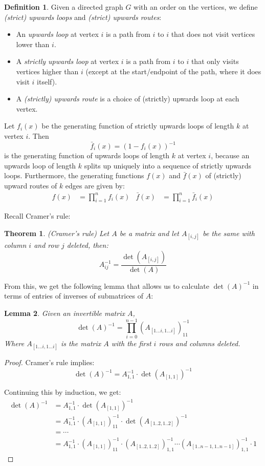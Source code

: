 \documentclass[a4paper, 11pt]{article}
\newtheorem{theorem}{Theorem}[section]
\newtheorem{lemma}[theorem]{Lemma}
\theoremstyle{definition}
\newtheorem{definition}{Definition}[section]
\begin{document}
\begin{definition}
  Given a directed graph $G$ with an order on the vertices, we define \emph{(strict) upwards loops} and \emph{(strict) upwards routes}:
  \begin{itemize}
    \item An \emph{upwards loop} at vertex $i$ is a path from $i$ to $i$ that does not visit vertices lower than $i$.
    \item A \emph{strictly upwards loop} at vertex $i$ is a path from $i$ to $i$ that only visits vertices higher than $i$ (except at the start/endpoint of the path, where it does visit $i$ itself).
    \item A \emph{(strictly) upwards route} is a choice of (strictly) upwards loop at each vertex.
  \end{itemize}
  Let $f_i(x)$ be the generating function of strictly upwards loops of length $k$ at vertex $i$. Then \[ \bar{f}_i(x) = (1 - f_i(x))^{-1} \] is the generating function of upwards loops of length $k$ at vertex $i$, because an upwards loop of length $k$ splits up uniquely into a sequence of strictly upwards loops. Furthermore, the generating functions $f(x)$ and $\bar{f}(x)$ of (strictly) upward routes of $k$ edges are given by:
  \begin{align*}
    f(x) &= \prod_{i=1}^n f_i(x) &
    \bar{f}(x) &= \prod_{i=1}^n \bar{f}_i(x)
  \end{align*}
\end{definition}

Recall Cramer's rule:
\begin{theorem} (Cramer's rule)
  Let $A$ be a matrix and let $A_{[i,j]}$ be the same with column $i$ and row $j$ deleted, then:
  \[ A^{-1}_{ij} = \frac{\det(A_{[i,j]})}{\det(A)} \]
\end{theorem}

From this, we get the following lemma that allows us to calculate $\det(A)^{-1}$ in terms of entries of inverses of submatrices of $A$:

\begin{lemma} Given an invertible matrix $A$,
  \[ \det(A)^{-1} = \prod_{i=0}^{n-1} (A_{[1\dots i, 1\dots i]})^{-1}_{11} \]
Where $A_{[1\dots i, 1\dots i]}$ is the matrix $A$ with the first $i$ rows and columns deleted.
\end{lemma}
\begin{proof}
  Cramer's rule implies:
\[
  \det(A)^{-1} = A^{-1}_{1,1} \cdot \det(A_{[1,1]})^{-1}
\]

Continuing this by induction, we get:
\begin{align*}
  \det(A)^{-1} &= A^{-1}_{1,1} \cdot \det(A_{[1,1]})^{-1} \\
    &= A^{-1}_{1,1} \cdot (A_{[1,1]})^{-1}_{11} \cdot \det(A_{[1..2,1..2]})^{-1} \\
    &= \cdots \\
    &= A^{-1}_{1,1} \cdot (A_{[1,1]})^{-1}_{11} \cdot (A_{[1..2,1..2]})^{-1}_{1,1} \cdots
        (A_{[1..n-1,1..n-1]})^{-1}_{1,1} \cdot 1
\end{align*}
\end{proof}
\end{document}
